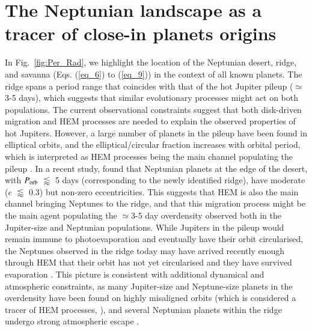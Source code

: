 \documentclass[]{aa}
\begin{document}
\section{The Neptunian landscape as a tracer of close-in planets origins}
\label{sec:discussion}


In Fig.~\ref{fig:Per_Rad}, we highlight the location of the Neptunian desert, ridge, and savanna (Eqs. (\ref{eq_6}) to (\ref{eq_9})) in the context of all known planets. The ridge spans a period range that coincides with that of the hot Jupiter pileup ($\simeq$3-5 days), which  suggests that similar evolutionary processes might act on both populations. The current observational constraints suggest that both disk-driven migration and HEM processes are needed to explain the observed properties of hot Jupiters. However, a large number of planets in the pileup have been found in elliptical orbits, and the elliptical/circular fraction increases with orbital period, which is interpreted as HEM processes being the main channel populating the pileup \citep[e.g.][]{2018ARA&A..56..175D,2021JGRE..12606629F}. In a recent study, \citet{2020A&A...635A..37C} found that Neptunian planets at the edge of the desert, with $P_{\rm orb}$ $\lessapprox$ 5 days (corresponding to the newly identified ridge), have moderate ($e$ $\lessapprox$ 0.3) but non-zero eccentricities. This suggests that HEM is also the main channel bringing Neptunes to the ridge, and that this migration process might be the main agent populating the $\simeq$3-5 day overdensity observed both in the Jupiter-size and Neptunian populations. While Jupiters in the pileup would remain immune to photoevaporation and eventually have their orbit circularised, the Neptunes observed in the ridge today may have arrived recently enough through HEM that their orbit has not yet circularised and they have survived evaporation \citep{2018Natur.553..477B,2020A&A...635A..37C,2021A&A...647A..40A}. This picture is consistent with additional dynamical and atmospheric constraints, as many Jupiter-size \citep{2012ApJ...757...18A} and Neptune-size \citep{2023A&A...669A..63B} planets in the overdensity have been found on highly misaligned orbits (which is considered a tracer of HEM processes, \citealp[e.g.][]{2012ApJ...754L..36N,2017AJ....154..106N}), and several Neptunian planets within the ridge undergo strong atmospheric escape \citep[e.g.][]{2015Natur.522..459E,2018A&A...620A.147B}. 
\end{document}

